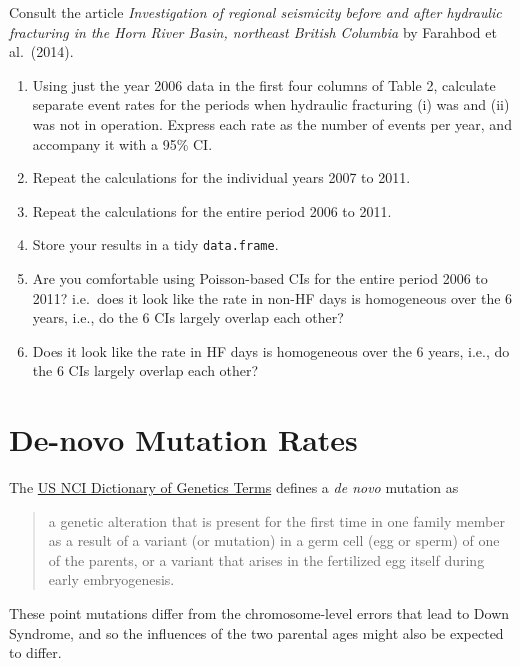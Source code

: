 \documentclass[letterpaper,11pt,twoside,]{pinp}
\begin{document}
Consult the article \emph{Investigation of regional seismicity before
and after hydraulic fracturing in the Horn River Basin, northeast
British Columbia} by Farahbod et al.~(2014).

\begin{enumerate}
\def\labelenumi{\alph{enumi})}
\item
  Using just the year 2006 data in the first four columns of Table 2,
  calculate separate event rates for the periods when hydraulic
  fracturing (i) was and (ii) was not in operation. Express each rate as
  the number of events per year, and accompany it with a 95\% CI.
\item
  Repeat the calculations for the individual years 2007 to 2011.
\item
  Repeat the calculations for the entire period 2006 to 2011.
\item
  Store your results in a tidy \texttt{data.frame}.
\item
  Are you comfortable using Poisson-based CIs for the entire period 2006
  to 2011? i.e.~does it look like the rate in non-HF days is homogeneous
  over the 6 years, i.e., do the 6 CIs largely overlap each other?
\item
  Does it look like the rate in HF days is homogeneous over the 6 years,
  i.e., do the 6 CIs largely overlap each other?
\end{enumerate}

\hypertarget{de-novo-mutation-rates}{%
\section{De-novo Mutation Rates}\label{de-novo-mutation-rates}}

The
\href{https://www.cancer.gov/publications/dictionaries/genetics-dictionary}
{US NCI Dictionary of Genetics Terms} defines a \textit{de novo}
mutation as

\begin{quote}
a genetic alteration that is present for the first time in one family
member as a result of a variant (or mutation) in a germ cell (egg or
sperm) of one of the parents, or a variant that arises in the fertilized
egg itself during early embryogenesis.
\end{quote}

These point mutations differ from the chromosome-level errors that lead
to Down Syndrome, and so the influences of the two parental ages might
also be expected to differ.
\end{document}
